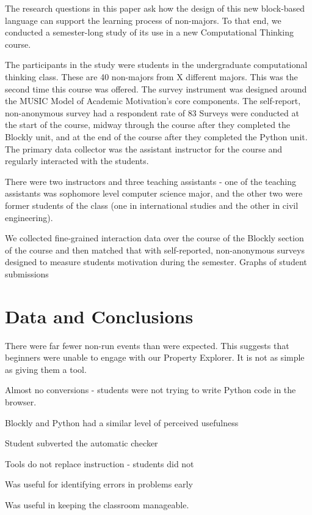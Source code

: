 \documentclass{sig-alternate}
\begin{document}
The research questions in this paper ask how the design of this new block-based language can support the learning process of non-majors. To that end, we conducted a semester-long study of its use in a new Computational Thinking course.

The participants in the study were students in the undergraduate computational thinking class. These are 40 non-majors from X different majors. This was the second time this course was offered. 
The survey instrument was designed around the MUSIC Model of Academic Motivation's core components. 
The self-report, non-anonymous survey had a respondent rate of 83%
Surveys were conducted at the start of the course, midway through the course after they completed the Blockly unit, and at the end of the course after they completed the Python unit.
The primary data collector was the assistant instructor for the course and regularly interacted with the students. 

There were two instructors and three teaching assistants - one of the teaching assistants was sophomore level computer science major, and the other two were former students of the class (one in international studies and the other in civil engineering). 

We collected fine-grained interaction data over the course of the Blockly section of the course and then matched that with self-reported, non-anonymous surveys designed to measure students motivation during the semester.
Graphs of student submissions

\section{Data and Conclusions}

There were far fewer non-run events than were expected. This suggests that beginners were unable to engage with our Property Explorer. It is not as simple as giving them a tool.

Almost no conversions - students were not trying to write Python code in the browser.

Blockly and Python had a similar level of perceived usefulness

Student subverted the automatic checker

Tools do not replace instruction - students did not 

Was useful for identifying errors in problems early

Was useful in keeping the classroom manageable.
\end{document}
